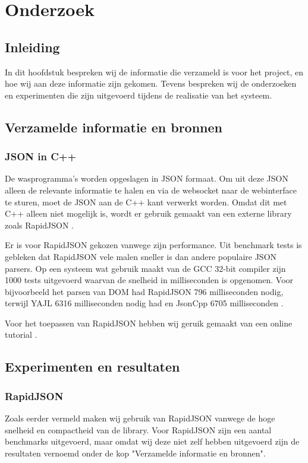 \chapter{Onderzoek}
\section{Inleiding}
In dit hoofdstuk bespreken wij de informatie die verzameld is voor het project, en hoe wij aan deze informatie zijn gekomen.
Tevens bespreken wij de onderzoeken en experimenten die zijn uitgevoerd tijdens de realisatie van het systeem.


\section{Verzamelde informatie en bronnen}
\subsection{JSON in C++}
De wasprogramma's worden opgeslagen in JSON formaat.
Om uit deze JSON alleen de relevante informatie te halen en via de websocket naar de webinterface te sturen, moet de JSON aan de C++ kant verwerkt worden.
Omdat dit met C++ alleen niet mogelijk is, wordt er gebruik gemaakt van een externe library zoals RapidJSON \cite{repo}.

Er is voor RapidJSON gekozen vanwege zijn performance. Uit benchmark tests is gebleken dat RapidJSON vele malen sneller is dan andere populaire JSON parsers.
Op een systeem wat gebruik maakt van de GCC 32-bit compiler zijn 1000 tests uitgevoerd waarvan de snelheid in milliseconden is opgenomen.
Voor bijvoorbeeld het parsen van DOM had RapidJSON 796 milliseconden nodig, terwijl YAJL 6316 milliseconden nodig had en JsonCpp 6705 milliseconden \cite{performance}.

Voor het toepassen van RapidJSON hebben wij geruik gemaakt van een online tutorial \cite{tutorial}.

\section{Experimenten en resultaten}
\subsection{RapidJSON}
Zoals eerder vermeld maken wij gebruik van RapidJSON vanwege de hoge snelheid en compactheid van de library.
Voor RapidJSON zijn een aantal benchmarks uitgevoerd, maar omdat wij deze niet zelf hebben uitgevoerd zijn de resultaten vernoemd onder de kop "Verzamelde informatie en bronnen".
